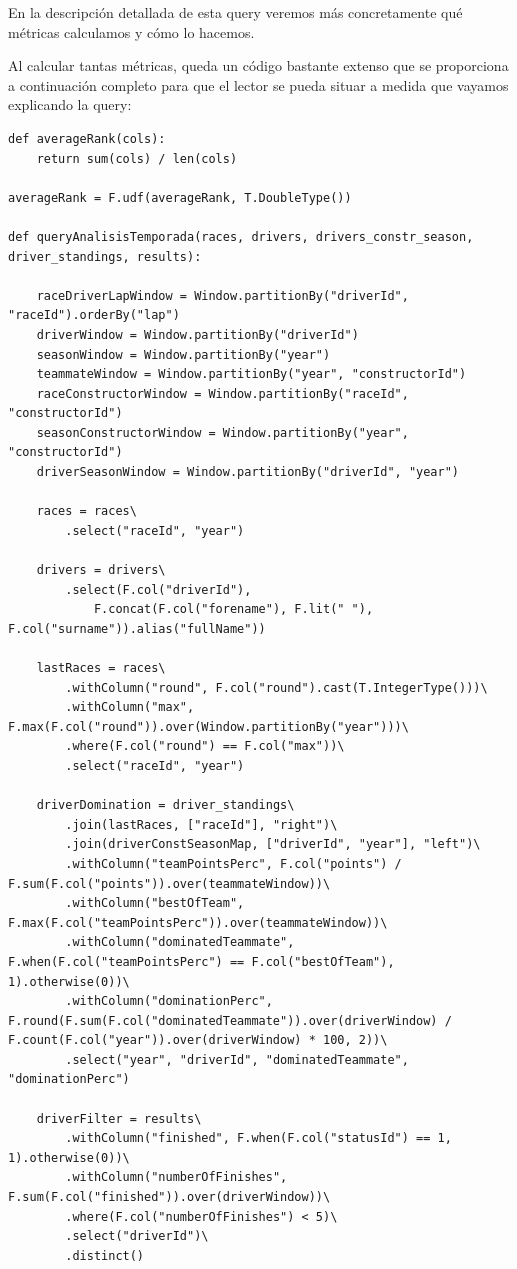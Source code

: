 \documentclass[12pt,twoside,titlepage]{report}
\begin{document}
En la descripción detallada de esta query veremos más concretamente qué métricas calculamos y cómo lo hacemos.

Al calcular tantas métricas, queda un código bastante extenso que se proporciona a continuación completo para que el lector se pueda situar a medida que vayamos explicando la query:

\begin{lstlisting}
def averageRank(cols):
	return sum(cols) / len(cols)

averageRank = F.udf(averageRank, T.DoubleType())

def queryAnalisisTemporada(races, drivers, drivers_constr_season, driver_standings, results):

	raceDriverLapWindow = Window.partitionBy("driverId", "raceId").orderBy("lap")
	driverWindow = Window.partitionBy("driverId")
	seasonWindow = Window.partitionBy("year")
	teammateWindow = Window.partitionBy("year", "constructorId")
	raceConstructorWindow = Window.partitionBy("raceId", "constructorId")
	seasonConstructorWindow = Window.partitionBy("year", "constructorId")
	driverSeasonWindow = Window.partitionBy("driverId", "year")

	races = races\
		.select("raceId", "year")

	drivers = drivers\
		.select(F.col("driverId"),
			F.concat(F.col("forename"), F.lit(" "), F.col("surname")).alias("fullName"))

	lastRaces = races\
		.withColumn("round", F.col("round").cast(T.IntegerType()))\
		.withColumn("max", F.max(F.col("round")).over(Window.partitionBy("year")))\
		.where(F.col("round") == F.col("max"))\
		.select("raceId", "year")

	driverDomination = driver_standings\
		.join(lastRaces, ["raceId"], "right")\
		.join(driverConstSeasonMap, ["driverId", "year"], "left")\
		.withColumn("teamPointsPerc", F.col("points") / F.sum(F.col("points")).over(teammateWindow))\
		.withColumn("bestOfTeam", F.max(F.col("teamPointsPerc")).over(teammateWindow))\
		.withColumn("dominatedTeammate", F.when(F.col("teamPointsPerc") == F.col("bestOfTeam"), 1).otherwise(0))\
		.withColumn("dominationPerc", F.round(F.sum(F.col("dominatedTeammate")).over(driverWindow) / F.count(F.col("year")).over(driverWindow) * 100, 2))\
		.select("year", "driverId", "dominatedTeammate", "dominationPerc")

	driverFilter = results\
		.withColumn("finished", F.when(F.col("statusId") == 1, 1).otherwise(0))\
		.withColumn("numberOfFinishes", F.sum(F.col("finished")).over(driverWindow))\
		.where(F.col("numberOfFinishes") < 5)\
		.select("driverId")\
		.distinct()


\end{lstlisting}
\end{document}
